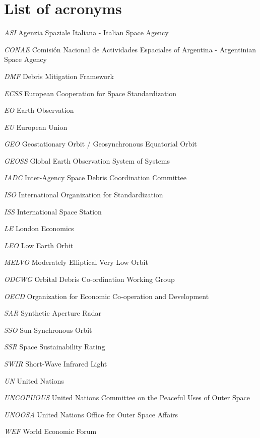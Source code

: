\documentclass[12pt,a4paper,notitlepage,twoside,openright]{report}
\begin{document}







\newpage



\chapter*{List of acronyms}
\begin{abbrv}
\item[\textit{ASI}] Agenzia Spaziale Italiana - Italian Space Agency
\item[\textit{CONAE}] Comisión Nacional de Actividades Espaciales of Argentina - \newline Argentinian Space Agency
\item[\textit{DMF}] Debris Mitigation Framework
\item[\textit{ECSS}] European Cooperation for Space Standardization
\item[\textit{EO}] Earth Observation
\item[\textit{EU}] European Union
\item[\textit{GEO}] Geostationary Orbit / Geosynchronous Equatorial Orbit
\item[\textit{GEOSS}] Global Earth Observation System of Systems
\item[\textit{IADC}] Inter-Agency Space Debris Coordination Committee
\item[\textit{ISO}] International Organization for Standardization
\item[\textit{ISS}] International Space Station
\item[\textit{LE}] London Economics
\item[\textit{LEO}] Low Earth Orbit
\item[\textit{MELVO}] Moderately Elliptical Very Low Orbit
\item[\textit{ODCWG}] Orbital Debris Co-ordination Working Group
\item[\textit{OECD}] Organization for Economic Co-operation and Development
\item[\textit{SAR}] Synthetic Aperture Radar
\item[\textit{SSO}] Sun-Synchronous Orbit
\item[\textit{SSR}] Space Sustainability Rating
\item[\textit{SWIR}] Short-Wave Infrared Light
\item[\textit{UN}] United Nations
\item[\textit{UNCOPUOUS}] United Nations Committee on the Peaceful Uses of Outer Space
\item[\textit{UNOOSA}] United Nations Office for Outer Space Affairs
\item[\textit{WEF}] World Economic Forum
\end{abbrv}
\end{document}
